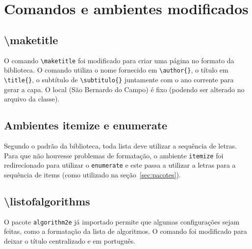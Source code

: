 \documentclass{fei}
\begin{document}
\section{Comandos e ambientes modificados}
    
    \subsection{\textbackslash maketitle}
    
    O comando \verb+\maketitle+ foi modificado para criar uma página no formato da biblioteca. O comando utiliza o nome fornecido em \verb+\author{}+, o título em \verb+\title{}+, o subtítulo de \verb+\subtitulo{}+ juntamente com o ano corrente para gerar a capa. O local (São Bernardo do Campo) é fixo (podendo ser alterado no arquivo da classe).


    \subsection{Ambientes itemize e enumerate}
    
    Segundo o padrão da biblioteca, toda lista deve utilizar a sequência de letras. Para que não houvesse problemas de formatação, o ambiente \verb+itemize+ foi redirecionado para utilizar o \verb+enumerate+ e este passa a utilizar a letras para a sequência de items (como utilizado na seção~\ref{sec:pacotes}).
    
    \subsection{\textbackslash listofalgorithms}
    
    O pacote \verb+algorithm2e+ já importado permite que algumas configurações sejam feitas, como a formatação da lista de algoritmos. O comando foi modificado para deixar o título centralizado e em português.
    
\end{document}
